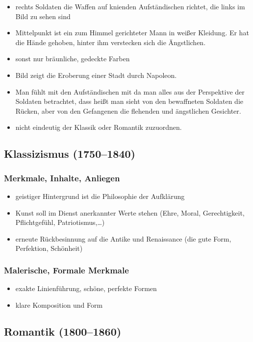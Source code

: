 \begin{itemize}
	\item rechts Soldaten die Waffen auf knienden Aufständischen richtet, die links im Bild zu sehen sind
	\item Mittelpunkt ist ein zum Himmel gerichteter Mann in weißer Kleidung.
	Er hat die Hände gehoben, hinter ihm verstecken sich die Ängstlichen.
	\item sonst nur bräunliche, gedeckte Farben
	\item Bild zeigt die Eroberung einer Stadt durch Napoleon.
	\item Man fühlt mit den Aufständischen mit da man alles aus der Perspektive der Soldaten betrachtet,
	dass heißt man sieht von den bewaffneten Soldaten die Rücken,
	aber von den Gefangenen die flehenden und ängstlichen Gesichter.
	\item nicht eindeutig der Klassik oder Romantik zuzuordnen.
\end{itemize}

\subsection{Klassizismus (1750--1840)}
\subsubsection{Merkmale, Inhalte, Anliegen}
\begin{itemize}
	\item geistiger Hintergrund ist die Philosophie der Aufklärung
	\item Kunst soll im Dienst anerkannter Werte stehen
	(\zB Ehre, Moral, Gerechtigkeit, Pflichtgefühl, Patriotismus,\dots)
	\item erneute Rückbesinnung auf die Antike und Renaissance (die gute Form, Perfektion, Schönheit)
\end{itemize}

\subsubsection{Malerische, Formale Merkmale}
\begin{itemize}
	\item exakte Linienführung, schöne, perfekte Formen
	\item klare Komposition und Form
\end{itemize}

\subsection{Romantik (1800--1860)}
